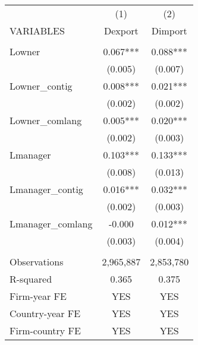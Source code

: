 \begin{tabular}{lcc} \hline
 & (1) & (2) \\
VARIABLES & Dexport & Dimport \\ \hline
 &  &  \\
Lowner & 0.067*** & 0.088*** \\
 & (0.005) & (0.007) \\
Lowner\_contig & 0.008*** & 0.021*** \\
 & (0.002) & (0.002) \\
Lowner\_comlang & 0.005*** & 0.020*** \\
 & (0.002) & (0.003) \\
Lmanager & 0.103*** & 0.133*** \\
 & (0.008) & (0.013) \\
Lmanager\_contig & 0.016*** & 0.032*** \\
 & (0.002) & (0.003) \\
Lmanager\_comlang & -0.000 & 0.012*** \\
 & (0.003) & (0.004) \\
 &  &  \\
Observations & 2,965,887 & 2,853,780 \\
R-squared & 0.365 & 0.375 \\
Firm-year FE & YES & YES \\
Country-year FE & YES & YES \\
 Firm-country FE & YES & YES \\ \hline
\end{tabular}
